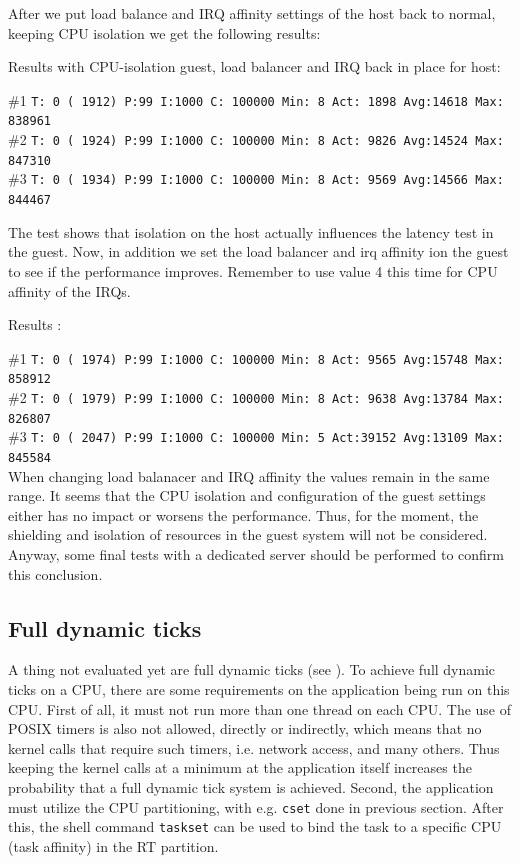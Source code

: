 \documentclass[]{scrartcl}
\begin{document}
After we put load balance and IRQ affinity settings of the host back to normal, keeping CPU isolation we get the following results:

\bigskip

\noindent Results with CPU-isolation guest, load balancer and IRQ back in place for host:

\noindent \#1 \small \texttt{T: 0 ( 1912) P:99 I:1000 C: 100000 Min:      8 Act: 1898 Avg:14618 Max:  838961}\\
\noindent \#2 \small \texttt{T: 0 ( 1924) P:99 I:1000 C: 100000 Min:      8 Act: 9826 Avg:14524 Max:  847310}\\
\noindent \#3 \small \texttt{T: 0 ( 1934) P:99 I:1000 C: 100000 Min:      8 Act: 9569 Avg:14566 Max:  844467}

The test shows that isolation on the host actually influences the latency test in the guest.
Now, in addition we set the load balancer and irq affinity ion the guest to see if the performance improves. Remember to use value 4 this time for CPU affinity of the IRQs.
\bigskip

\noindent Results :

\noindent \#1 \small \texttt{T: 0 ( 1974) P:99 I:1000 C: 100000 Min:      8 Act: 9565 Avg:15748 Max:  858912}\\
\noindent \#2 \small \texttt{T: 0 ( 1979) P:99 I:1000 C: 100000 Min:      8 Act: 9638 Avg:13784 Max:  826807}\\
\noindent \#3 \small \texttt{T: 0 ( 2047) P:99 I:1000 C: 100000 Min:      5 Act:39152 Avg:13109 Max:  845584}\\

When changing load balanacer and IRQ affinity the values remain in the same range. It seems that the CPU isolation and configuration of the guest settings either has no impact or worsens the performance.
Thus, for the moment, the shielding and isolation of resources in the guest system will not be considered. 
Anyway, some final tests with a dedicated server should be performed to confirm this conclusion.

\subsection{Full dynamic ticks}

A thing not evaluated yet are full dynamic ticks (see \cite{lrt02}). To achieve full dynamic ticks on a CPU, there are some requirements on the application being run on this CPU. First of all, it must not run more than one thread on each CPU. The use of POSIX timers is also not allowed, directly or indirectly, which means that no kernel calls that require such timers, i.e. network access, and many others. Thus keeping the kernel calls at a minimum at the application itself increases the probability that a full dynamic tick system is achieved.
Second, the application must utilize the CPU partitioning, with e.g. \texttt{cset} done in previous section. After this, the shell command \texttt{taskset} can be used to bind the task to a specific CPU (task affinity) in the RT partition.
\end{document}
